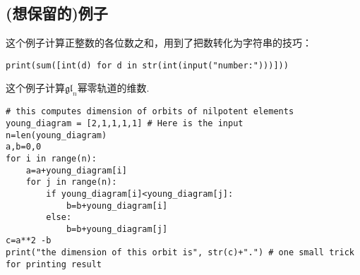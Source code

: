 \documentclass[11pt]{amsart}
\begin{document}
\subsection{(想保留的)例子}
这个例子计算正整数的各位数之和，用到了把数转化为字符串的技巧：
\begin{lstlisting}[language=iPython]
print(sum([int(d) for d in str(int(input("number:")))]))
\end{lstlisting}
这个例子计算$\mathfrak{gl}_n$幂零轨道的维数.
\begin{lstlisting}[language=iPython]
# this computes dimension of orbits of nilpotent elements
young_diagram = [2,1,1,1,1] # Here is the input
n=len(young_diagram)
a,b=0,0
for i in range(n):
    a=a+young_diagram[i]
    for j in range(n):
        if young_diagram[i]<young_diagram[j]:
            b=b+young_diagram[i]
        else:
            b=b+young_diagram[j]
c=a**2 -b
print("the dimension of this orbit is", str(c)+".") # one small trick for printing result
\end{lstlisting}
\end{document}
